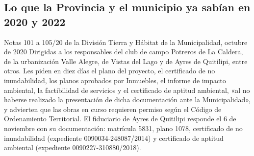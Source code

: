 \subsection*{Lo que la Provincia y el municipio ya sabían en 2020 y 2022}

\begin{ficha}{Notas 101 a 105/20 de la División Tierra y Hábitat de la Municipalidad, octubre de 2020}
Dirigidas a los responsables del club de campo Potreros de La Caldera, de la urbanización Valle Alegre, de Vistas del Lago y de Ayres de Quitilipi, entre otros. Les piden en diez días el plano del proyecto, el certificado de no inundabilidad, los planos aprobados por Inmuebles, el informe de impacto ambiental, la factibilidad de servicios y el certificado de aptitud ambiental, «al no haberse realizado la presentación de dicha documentación ante la Municipalidad», y advierten que las obras en curso requieren permiso según el Código de Ordenamiento Territorial. El fiduciario de Ayres de Quitilipi responde el 6 de noviembre con su documentación: matrícula 5831, plano 1078, certificado de no inundabilidad (expediente 0090034-248087/2014) y certificado de aptitud ambiental (expediente 0090227-310880/2018).
\end{ficha}

